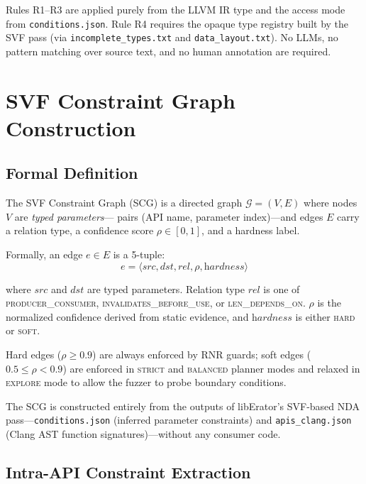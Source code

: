 \documentclass[sigconf,anonymous]{acmart}
\begin{document}
\noindent Rules R1--R3 are applied purely from the LLVM IR type and the
access mode from \texttt{conditions.json}.  Rule R4 requires the opaque
type registry built by the SVF pass (via \texttt{incomplete\_types.txt}
and \texttt{data\_layout.txt}).  No LLMs, no pattern matching over
source text, and no human annotation are required.

\section{SVF Constraint Graph Construction}
\label{sec:cg}

\subsection{Formal Definition}

The SVF Constraint Graph (SCG) is a directed graph
$\mathcal{G} = (V, E)$ where nodes $V$ are \emph{typed parameters}---
pairs (API name, parameter index)---and edges $E$ carry a relation type,
a confidence score $\rho \in [0,1]$, and a hardness label.

Formally, an edge $e \in E$ is a 5-tuple:
\[
  e = \langle \textit{src}, \textit{dst}, \textit{rel}, \rho, \textit{hardness} \rangle
\]

\noindent where $\textit{src}$ and $\textit{dst}$ are typed parameters.
Relation type $\textit{rel}$ is one of
\textsc{producer\_consumer}, \textsc{invalidates\_before\_use}, or
\textsc{len\_depends\_on}.  $\rho$ is the normalized confidence derived
from static evidence, and $\textit{hardness}$ is either
\textsc{hard} or \textsc{soft}.

Hard edges ($\rho \geq 0.9$) are always enforced by RNR guards; soft
edges ($0.5 \leq \rho < 0.9$) are enforced in \textsc{strict} and
\textsc{balanced} planner modes and relaxed in \textsc{explore} mode to
allow the fuzzer to probe boundary conditions.

The SCG is constructed entirely from the outputs of libErator's SVF-based
NDA pass---\texttt{conditions.json} (inferred parameter constraints) and
\texttt{apis\_clang.json} (Clang AST function signatures)---without any
consumer code.

\subsection{Intra-API Constraint Extraction}
\end{document}
